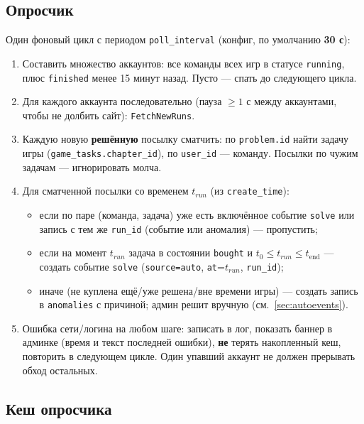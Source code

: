 \documentclass[12pt,a4paper]{article}
\newcommand{\field}[1]{\texttt{#1}}
\begin{document}
\subsection{Опросчик}

Один фоновый цикл с периодом \field{poll\_interval} (конфиг, по умолчанию
\textbf{30 с}):

\begin{enumerate}[nosep]
  \item Составить множество аккаунтов: все команды всех игр в статусе
        \field{running}, плюс \field{finished} менее 15 минут назад.
        Пусто --- спать до следующего цикла.
  \item Для каждого аккаунта последовательно (пауза $\ge 1$ с между
        аккаунтами, чтобы не долбить сайт): \field{FetchNewRuns}.
  \item Каждую новую \textbf{решённую} посылку сматчить: по
        \field{problem.id} найти задачу игры (\field{game\_tasks.chapter\_id}),
        по \field{user\_id} --- команду. Посылки по чужим задачам ---
        игнорировать молча.
  \item Для сматченной посылки со временем $t_{run}$ (из \field{create\_time}):
        \begin{itemize}[nosep]
          \item если по паре (команда, задача) уже есть включённое событие
                \field{solve} или запись с тем же \field{run\_id} (событие
                или аномалия) --- пропустить;
          \item если на момент $t_{run}$ задача в состоянии \field{bought}
                и $t_0 \le t_{run} \le t_{\mathrm{end}}$ --- создать событие
                \field{solve} (\field{source=auto}, \field{at}=$t_{run}$,
                \field{run\_id});
          \item иначе (не куплена ещё/уже решена/вне времени игры) ---
                создать запись в \field{anomalies} с причиной; админ решит
                вручную (см.~\ref{sec:autoevents}).
        \end{itemize}
  \item Ошибка сети/логина на любом шаге: записать в лог, показать баннер в
        админке (время и текст последней ошибки), \textbf{не} терять
        накопленный кеш, повторить в следующем цикле. Один упавший аккаунт
        не должен прерывать обход остальных.
\end{enumerate}

\subsection{Кеш опросчика}
\label{sec:cache}
\end{document}
